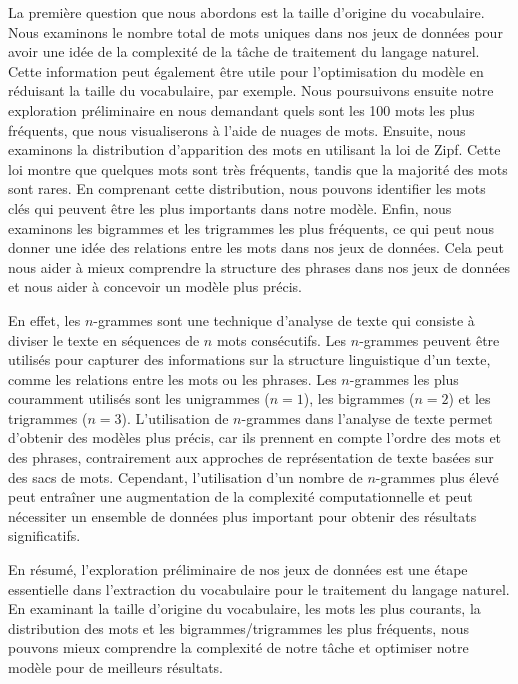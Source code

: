 \documentclass{article}
\begin{document}
La première question que nous abordons est la taille d'origine du vocabulaire. Nous examinons le nombre total de mots uniques dans nos jeux de données pour avoir une idée de la complexité de la tâche de traitement du langage naturel. Cette information peut également être utile pour l'optimisation du modèle en réduisant la taille du vocabulaire, par exemple. Nous poursuivons ensuite notre exploration préliminaire en nous demandant quels sont les 100 mots les plus fréquents, que nous visualiserons à l'aide de nuages de mots. Ensuite, nous examinons la distribution d'apparition des mots en utilisant la loi de Zipf. Cette loi montre que quelques mots sont très fréquents, tandis que la majorité des mots sont rares. En comprenant cette distribution, nous pouvons identifier les mots clés qui peuvent être les plus importants dans notre modèle. Enfin, nous examinons les bigrammes et les trigrammes les plus fréquents, ce qui peut nous donner une idée des relations entre les mots dans nos jeux de données. Cela peut nous aider à mieux comprendre la structure des phrases dans nos jeux de données et nous aider à concevoir un modèle plus précis. 

En effet, les $n$-grammes sont une technique d'analyse de texte qui consiste à diviser le texte en séquences de $n$ mots consécutifs. Les $n$-grammes peuvent être utilisés pour capturer des informations sur la structure linguistique d'un texte, comme les relations entre les mots ou les phrases. Les $n$-grammes les plus couramment utilisés sont les unigrammes ($n = 1$), les bigrammes ($n = 2$) et les trigrammes ($n = 3$). L'utilisation de $n$-grammes dans l'analyse de texte permet d'obtenir des modèles plus précis, car ils prennent en compte l'ordre des mots et des phrases, contrairement aux approches de représentation de texte basées sur des sacs de mots. Cependant, l'utilisation d'un nombre de $n$-grammes plus élevé peut entraîner une augmentation de la complexité computationnelle et peut nécessiter un ensemble de données plus important pour obtenir des résultats significatifs.

En résumé, l'exploration préliminaire de nos jeux de données est une étape essentielle dans l'extraction du vocabulaire pour le traitement du langage naturel. En examinant la taille d'origine du vocabulaire, les mots les plus courants, la distribution des mots et les bigrammes/trigrammes les plus fréquents, nous pouvons mieux comprendre la complexité de notre tâche et optimiser notre modèle pour de meilleurs résultats.
\end{document}

